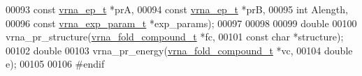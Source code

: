 \begin{DoxyCode}
00093                           \textcolor{keyword}{const} \hyperlink{group__struct__utils_structvrna__elem__prob__s}{vrna\_ep\_t}         *prA,
00094                           \textcolor{keyword}{const} \hyperlink{group__struct__utils_structvrna__elem__prob__s}{vrna\_ep\_t}         *prB,
00095                           \textcolor{keywordtype}{int}                     Alength,
00096                           \textcolor{keyword}{const} \hyperlink{group__energy__parameters_structvrna__exp__param__s}{vrna\_exp\_param\_t}  *exp\_params);
00097 
00098 
00099 \textcolor{keywordtype}{double}
00100 vrna\_pr\_structure(\hyperlink{group__fold__compound_structvrna__fc__s}{vrna\_fold\_compound\_t} *fc,
00101                   \textcolor{keyword}{const} \textcolor{keywordtype}{char} *structure);
00102 \textcolor{keywordtype}{double}
00103 vrna\_pr\_energy(\hyperlink{group__fold__compound_structvrna__fc__s}{vrna\_fold\_compound\_t} *vc,
00104                \textcolor{keywordtype}{double} e);
00105 
00106 \textcolor{preprocessor}{#endif}
\end{DoxyCode}
